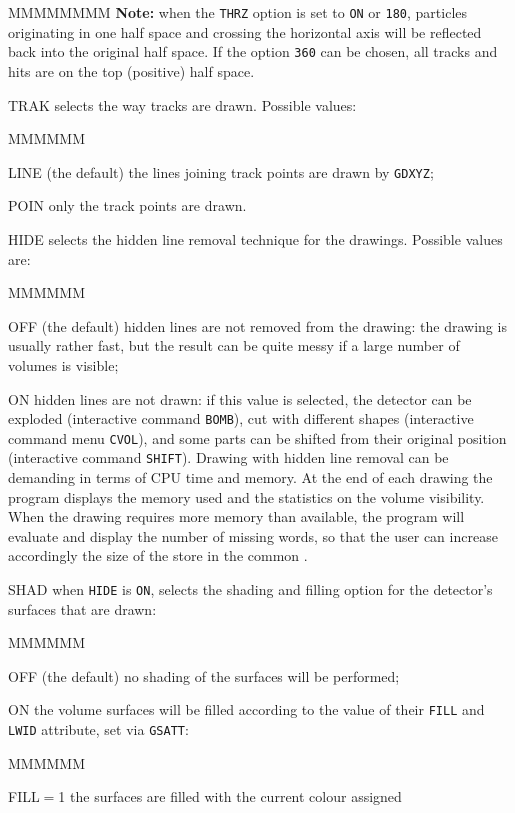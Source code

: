 \begin{DLtt}{MMMMMMMM}
{\bf Note:} when the {\tt THRZ} option is set to {\tt ON} or {\tt 180},
particles originating in one half space and crossing the horizontal axis
will be reflected back into the original half space. If the option 
{\tt 360} can be 
chosen, all tracks and hits are on the top (positive) half space.
\item[TRAK] selects the way tracks are drawn. Possible values:
\begin{DLtt}{MMMMMM}
\item[LINE] (the default) the lines joining track points are drawn by 
{\tt GDXYZ};
\item[POIN] only the track points are drawn.
\end{DLtt}
\item[HIDE] selects the hidden line removal technique for the
drawings. Possible values are:
\begin{DLtt}{MMMMMM}
\item[OFF] (the default) hidden lines are not removed from the drawing:
the drawing is usually rather fast, but the result can be
quite messy if a large number of volumes is visible;
\item[ON] hidden lines are not drawn: if this value is selected, the 
detector can be exploded (interactive command {\tt BOMB}), cut with 
different shapes (interactive command menu {\tt CVOL}), and some parts 
can be shifted from their original position (interactive command 
{\tt SHIFT}). Drawing with hidden line removal can be demanding in
terms of CPU time and memory. At the end of each drawing
the program displays the memory used and the statistics on the 
volume visibility. When the drawing requires more memory 
than available, the program will evaluate and display the number of 
missing words, so that the user can increase accordingly the
size of the  store in the common .
\end{DLtt}
\item[SHAD] when {\tt HIDE} is {\tt ON}, selects the 
shading and filling option for the detector's surfaces that are drawn:
\begin{DLtt}{MMMMMM}
\item[OFF] (the default) no shading of the surfaces will be performed;
\item[ON]  the volume surfaces will be filled according to the value of 
their {\tt FILL} and {\tt LWID} attribute, set via {\tt GSATT}:
\begin{DLtt}{MMMMMM}
\item[FILL$=$1] the surfaces are filled with the current colour assigned

\end{DLtt}
\end{DLtt}
\end{DLtt}
